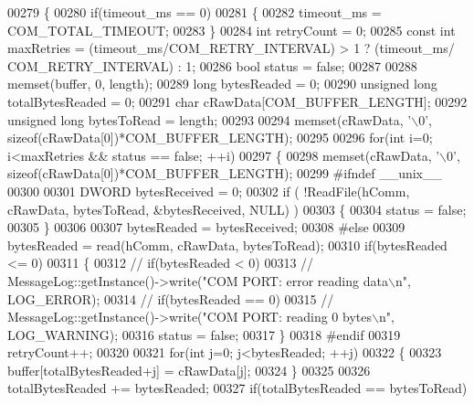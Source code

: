 \begin{DoxyCode}
00279 \{
00280     \textcolor{keywordflow}{if}(timeout\_ms == 0)
00281     \{
00282         timeout\_ms = COM_TOTAL_TIMEOUT;
00283     \}
00284     \textcolor{keywordtype}{int} retryCount = 0;
00285     \textcolor{keyword}{const} \textcolor{keywordtype}{int} maxRetries = (timeout\_ms/COM_RETRY_INTERVAL) > 1 ? (timeout\_ms/
      COM_RETRY_INTERVAL) : 1;
00286     \textcolor{keywordtype}{bool} status = \textcolor{keyword}{false};
00287 
00288     memset(buffer, 0, length);
00289     \textcolor{keywordtype}{long} bytesReaded = 0;
00290     \textcolor{keywordtype}{unsigned} \textcolor{keywordtype}{long} totalBytesReaded = 0;
00291     \textcolor{keywordtype}{char} cRawData[COM_BUFFER_LENGTH];
00292     \textcolor{keywordtype}{unsigned} \textcolor{keywordtype}{long} bytesToRead = length;
00293 
00294     memset(cRawData, \textcolor{charliteral}{'\(\backslash\)0'}, \textcolor{keyword}{sizeof}(cRawData[0])*COM_BUFFER_LENGTH);
00295 
00296     \textcolor{keywordflow}{for}(\textcolor{keywordtype}{int} i=0; i<maxRetries && status == \textcolor{keyword}{false}; ++i)
00297     \{
00298         memset(cRawData, \textcolor{charliteral}{'\(\backslash\)0'}, \textcolor{keyword}{sizeof}(cRawData[0])*COM\_BUFFER\_LENGTH);
00299 \textcolor{preprocessor}{#ifndef \_\_unix\_\_}
00300 
00301         DWORD bytesReceived = 0;
00302         \textcolor{keywordflow}{if} ( !ReadFile(hComm, cRawData, bytesToRead, &bytesReceived, NULL) )
00303         \{
00304             status = \textcolor{keyword}{false};
00305         \}
00306 
00307         bytesReaded = bytesReceived;
00308 \textcolor{preprocessor}{#else}
00309         bytesReaded = read(hComm, cRawData, bytesToRead);
00310         \textcolor{keywordflow}{if}(bytesReaded <= 0)
00311         \{
00312 \textcolor{comment}{//            if(bytesReaded < 0)}
00313 \textcolor{comment}{//                MessageLog::getInstance()->write("COM PORT: error reading data\(\backslash\)n", LOG\_ERROR);}
00314 \textcolor{comment}{//            if(bytesReaded == 0)}
00315 \textcolor{comment}{//                MessageLog::getInstance()->write("COM PORT: reading 0 bytes\(\backslash\)n", LOG\_WARNING);}
00316             status = \textcolor{keyword}{false};
00317         \}
00318 \textcolor{preprocessor}{#endif}
00319         retryCount++;
00320 
00321         \textcolor{keywordflow}{for}(\textcolor{keywordtype}{int} j=0; j<bytesReaded; ++j)
00322         \{
00323             buffer[totalBytesReaded+j] = cRawData[j];
00324         \}
00325 
00326         totalBytesReaded += bytesReaded;
00327         \textcolor{keywordflow}{if}(totalBytesReaded == bytesToRead)

\end{DoxyCode}
